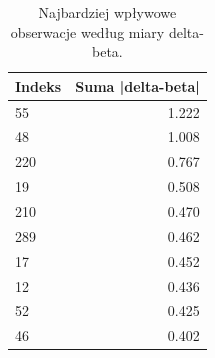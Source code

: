\begin{table}[htbp]
\centering
\caption{Najbardziej wpływowe obserwacje według miary delta-beta.}
\label{tab:influence}
\small
\setlength{\tabcolsep}{1.5pt}
\begin{tabular}{lr}
\toprule
Indeks & Suma |delta-beta| \\
\midrule
55 & 1.222 \\
48 & 1.008 \\
220 & 0.767 \\
19 & 0.508 \\
210 & 0.470 \\
289 & 0.462 \\
17 & 0.452 \\
12 & 0.436 \\
52 & 0.425 \\
46 & 0.402 \\
\bottomrule
\end{tabular}
\end{table}
